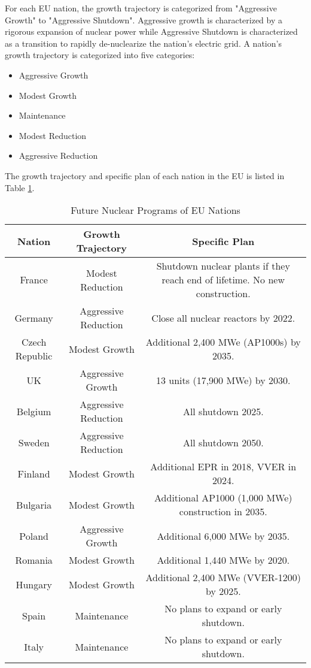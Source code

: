 For each EU nation, the growth trajectory is categorized from
"Aggressive Growth" to "Aggressive Shutdown". Aggressive growth is
characterized by a rigorous expansion of nuclear power while 
Aggressive Shutdown is characterized as a transition to rapidly
de-nuclearize the nation's electric grid. A nation's growth trajectory is
categorized into five categories:

\begin{itemize}
	\item Aggressive Growth
	\item Modest Growth 
	\item Maintenance
	\item Modest Reduction
	\item Aggressive Reduction
\end{itemize}

The growth trajectory and specific plan of each nation in the EU 
is listed in Table \ref{tab:eu_growth}.

\begin{table}[h]
	\centering
	\label{tab:eu_growth}
		\begin{tabular}{|c|c|c|}
			\hline
			Nation & Growth Trajectory & Specific Plan \\
			\hline
			France & Modest Reduction & Shutdown nuclear plants if they reach end of lifetime. No new construction.\\
			Germany & Aggressive Reduction & Close all nuclear reactors by 2022.\\
			Czech Republic & Modest Growth & Additional 2,400 MWe (AP1000s) by 2035.\\
			UK & Aggressive Growth & 13 units (17,900 MWe) by 2030.\\
			Belgium & Aggressive Reduction & All shutdown 2025.\\
			Sweden & Aggressive Reduction & All shutdown 2050.\\
			Finland & Modest Growth & Additional EPR in 2018, VVER in 2024.\\
			Bulgaria & Modest Growth & Additional AP1000 (1,000 MWe) construction in 2035. \\
			Poland & Aggressive Growth & Additional 6,000 MWe by 2035.\\
			Romania & Modest Growth & Additional 1,440 MWe by 2020. \\
			Hungary & Modest Growth & Additional 2,400 MWe (VVER-1200) by 2025. \\ 
			Spain & Maintenance & No plans to expand or early shutdown. \\
			Italy & Maintenance  & No plans to expand or early shutdown. \\
			\hline
		\end{tabular}
	\caption {Future Nuclear Programs of EU Nations \cite{world_nuclear_association_nuclear_2017}}
\end{table}


